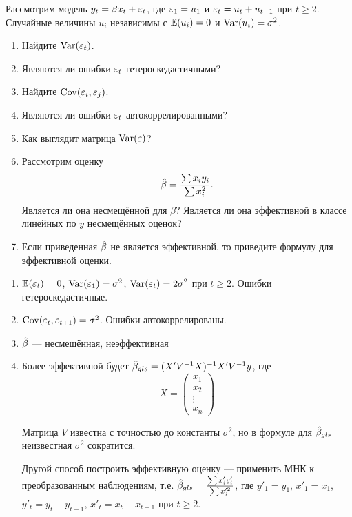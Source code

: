 \begin{problem}
Рассмотрим модель $y_t=\beta x_t +\varepsilon_t$, где $\varepsilon_1=u_1$ и $\varepsilon_t=u_t+u_{t-1}$ при $t\geq 2$. Случайные величины $u_i$ независимы с $\mathbb{E}(u_i)=0$ и $\operatorname{Var}(u_i)=\sigma^2$.
\begin{enumerate}
\item Найдите $\operatorname{Var}(\varepsilon_t)$.
\item Являются ли ошибки $\varepsilon_t$ гетероскедастичными?
\item Найдите $\operatorname{Cov}(\varepsilon_i,\varepsilon_j)$.
\item Являются ли ошибки $\varepsilon_t$ автокоррелированными?
\item Как выглядит матрица $\operatorname{Var}(\varepsilon)$?
\item Рассмотрим оценку
\[
\hat{\beta}=\frac{\sum x_i y_i}{\sum x_i^2}.
\]
Является ли она несмещённой для $\beta$? Является ли она эффективной в классе линейных по $y$ несмещённых оценок?
\item Если приведенная $\hat{\beta}$ не является эффективной, то приведите формулу для эффективной оценки.
\end{enumerate}



\begin{sol}
\begin{enumerate}
\item $\mathbb{E}(\varepsilon_t)=0$, $\operatorname{Var}(\varepsilon_1)=\sigma^2$, $\operatorname{Var}(\varepsilon_t)=2\sigma^2$ при $t\geq 2$.
Ошибки гетероскедастичные.
\item $\operatorname{Cov}(\varepsilon_t,\varepsilon_{t+1})=\sigma^2$. Ошибки автокоррелированы.
\item $\hat{\beta}$ — несмещённая, неэффективная
\item Более эффективной будет $\hat{\beta}_{gls}=(X'V^{-1}X)^{-1}X'V^{-1}y$, где
\[
X=\begin{pmatrix}
x_1 \\
x_2 \\
\vdots \\
x_n
\end{pmatrix}
\]

Матрица $V$ известна с точностью до константы $\sigma^2$, но в формуле для $\hat{\beta}_{gls}$ неизвестная $\sigma^2$ сократится.

Другой способ построить эффективную оценку — применить МНК к преобразованным наблюдениям, т.е. $\hat{\beta}_{gls}=\frac{\sum x'_i y'_i}{\sum x_i^{\prime 2}}$, где $y'_1=y_1$, $x'_1=x_1$, $y'_t=y_t-y_{t-1}$, $x'_t=x_t-x_{t-1}$ при $t\geq 2$.
\end{enumerate}
\end{sol}
\end{problem}



